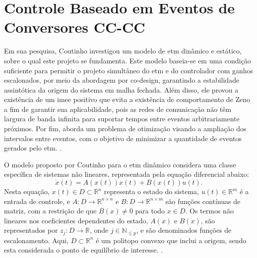 \chapter{Controle Baseado em Eventos de Conversores CC-CC} \label{cap4}


Em sua pesquisa, Coutinho investigou um modelo de \acrshort{etm} dinâmico e estático, sobre o qual este projeto se fundamenta. Este modelo baseia-se em uma condição suficiente para permitir o projeto simultâneo do \acrshort{etm} e do controlador com ganhos escalonados, por meio da abordagem por co-design, garantindo a estabilidade assintótica da origem do sistema em malha fechada. Além disso, ele provou a existência de um \acrfull{imee} positivo que evita a existência de comportamento de Zeno a fim de garantir sua aplicabilidade, pois as redes de comunicação não têm largura de banda infinita para suportar tempos entre eventos arbitrariamente próximos. Por fim, aborda um problema de otimização visando a ampliação dos intervalos entre eventos, com o objetivo de minimizar a quantidade de eventos gerados pelo \acrshort{etm}. \cite{coutinho2021}.

O modelo proposto por Coutinho para o \acrshort{etm} dinâmico considera uma classe específica de sistemas não lineares, representada pela equação diferencial abaixo: \begin{equation} \dot{x}(t) = A(x(t))x(t) + B(x(t))u(t). \label{eq:etm-sys}\end{equation} Nesta equação, $ x(t) \in D \subset \mathbb{R}^n $ representa o estado do sistema, $ u(t) \in \mathbb{R}^m $ é a entrada de controle, e $ A: D \rightarrow \mathbb{R}^{n \times n} $ e $ B: D \rightarrow \mathbb{R}^{n \times m} $ são funções contínuas de matriz, com a restrição de que $ B(x) \neq 0 $ para todo $ x \in D $. Os termos não lineares nos coeficientes dependentes do estado, $ A(x) $ e $ B(x) $, são representados por $ z_j: D \rightarrow \mathbb{R} $, onde $ j \in \mathbb{N}_{\leq p} $, e são denominados funções de escalonamento. Aqui, $ D \subset \mathbb{R}^n $ é um politopo convexo que inclui a origem, sendo esta considerada o ponto de equilíbrio de interesse. \cite{coutinho2021}.

